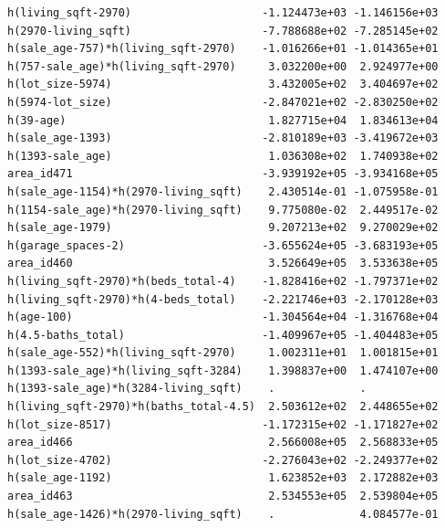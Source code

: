\documentclass[
]{article}
\begin{document}
\begin{verbatim}
h(living_sqft-2970)                    -1.124473e+03 -1.146156e+03
h(2970-living_sqft)                    -7.788688e+02 -7.285145e+02
h(sale_age-757)*h(living_sqft-2970)    -1.016266e+01 -1.014365e+01
h(757-sale_age)*h(living_sqft-2970)     3.032200e+00  2.924977e+00
h(lot_size-5974)                        3.432005e+02  3.404697e+02
h(5974-lot_size)                       -2.847021e+02 -2.830250e+02
h(39-age)                               1.827715e+04  1.834613e+04
h(sale_age-1393)                       -2.810189e+03 -3.419672e+03
h(1393-sale_age)                        1.036308e+02  1.740938e+02
area_id471                             -3.939192e+05 -3.934168e+05
h(sale_age-1154)*h(2970-living_sqft)    2.430514e-01 -1.075958e-01
h(1154-sale_age)*h(2970-living_sqft)    9.775080e-02  2.449517e-02
h(sale_age-1979)                        9.207213e+02  9.270029e+02
h(garage_spaces-2)                     -3.655624e+05 -3.683193e+05
area_id460                              3.526649e+05  3.533638e+05
h(living_sqft-2970)*h(beds_total-4)    -1.828416e+02 -1.797371e+02
h(living_sqft-2970)*h(4-beds_total)    -2.221746e+03 -2.170128e+03
h(age-100)                             -1.304564e+04 -1.316768e+04
h(4.5-baths_total)                     -1.409967e+05 -1.404483e+05
h(sale_age-552)*h(living_sqft-2970)     1.002311e+01  1.001815e+01
h(1393-sale_age)*h(living_sqft-3284)    1.398837e+00  1.474107e+00
h(1393-sale_age)*h(3284-living_sqft)    .             .           
h(living_sqft-2970)*h(baths_total-4.5)  2.503612e+02  2.448655e+02
h(lot_size-8517)                       -1.172315e+02 -1.171827e+02
area_id466                              2.566008e+05  2.568833e+05
h(lot_size-4702)                       -2.276043e+02 -2.249377e+02
h(sale_age-1192)                        1.623852e+03  2.172882e+03
area_id463                              2.534553e+05  2.539804e+05
h(sale_age-1426)*h(2970-living_sqft)    .             4.084577e-01
                                                                  

\end{verbatim}
\end{document}

